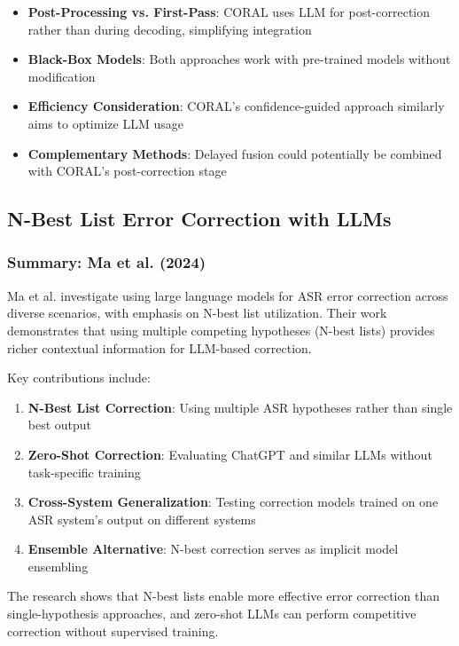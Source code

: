 \begin{itemize}[topsep=4pt,itemsep=2pt]
    \item \textbf{Post-Processing vs. First-Pass}: CORAL uses LLM for post-correction rather than during decoding, simplifying integration
    \item \textbf{Black-Box Models}: Both approaches work with pre-trained models without modification
    \item \textbf{Efficiency Consideration}: CORAL's confidence-guided approach similarly aims to optimize LLM usage
    \item \textbf{Complementary Methods}: Delayed fusion could potentially be combined with CORAL's post-correction stage
\end{itemize}

\subsection{N-Best List Error Correction with LLMs}

\subsubsection{Summary: Ma et al. (2024)}

Ma et al. \cite{ma2024} investigate using large language models for ASR error correction across diverse scenarios, with emphasis on N-best list utilization. Their work demonstrates that using multiple competing hypotheses (N-best lists) provides richer contextual information for LLM-based correction.

Key contributions include:

\begin{enumerate}[topsep=6pt,itemsep=3pt]
    \item \textbf{N-Best List Correction}: Using multiple ASR hypotheses rather than single best output
    \item \textbf{Zero-Shot Correction}: Evaluating ChatGPT and similar LLMs without task-specific training
    \item \textbf{Cross-System Generalization}: Testing correction models trained on one ASR system's output on different systems
    \item \textbf{Ensemble Alternative}: N-best correction serves as implicit model ensembling
\end{enumerate}

The research shows that N-best lists enable more effective error correction than single-hypothesis approaches, and zero-shot LLMs can perform competitive correction without supervised training.


